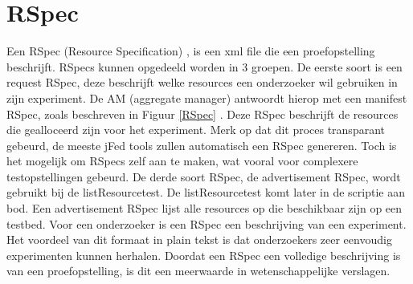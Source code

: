 \section{RSpec}
\npar
Een RSpec (Resource Specification) , is een xml file die een proefopstelling beschrijft\citep{geni-RSpec}. 
RSpecs kunnen opgedeeld worden in 3 groepen. De eerste soort is een request RSpec, deze beschrijft welke resources een onderzoeker wil gebruiken in zijn experiment. De AM (aggregate manager) antwoordt hierop met een manifest RSpec, zoals beschreven in Figuur \ref{RSpec} . Deze RSpec beschrijft de resources die gealloceerd zijn voor het experiment. Merk op dat dit proces transparant gebeurd, de meeste jFed tools zullen automatisch een RSpec genereren. Toch is het mogelijk om RSpecs zelf aan te maken, wat vooral voor complexere testopstellingen gebeurd.
\clearpage
\npar
De derde soort RSpec, de advertisement RSpec, wordt gebruikt bij de listResourcetest. De listResourcetest komt later in de scriptie aan bod. Een advertisement RSpec lijst alle resources op die beschikbaar zijn op een testbed.
\npar
Voor een onderzoeker is een RSpec een beschrijving van een experiment. Het voordeel van dit formaat in plain tekst is dat onderzoekers zeer eenvoudig experimenten kunnen herhalen. Doordat een RSpec een volledige beschrijving is van een proefopstelling, is dit een meerwaarde in wetenschappelijke verslagen.

